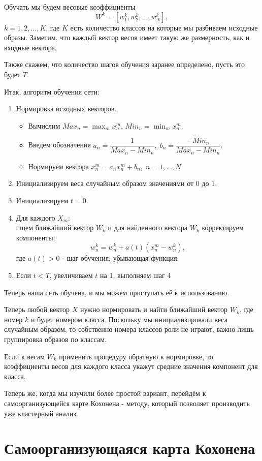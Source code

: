 \documentclass[a4paper,12pt]{article}
\begin{document}
Обучать мы будем весовые коэффициенты
\[
  W^k = [w_1^k, w_2^k, ..., w_N^k],
\]
$k = 1, 2, ..., K$, где $K$ есть количество классов на которые мы разбиваем исходные образы. Заметим, что каждый вектор весов имеет такую же размерность, как и входные вектора.

Также скажем, что количество шагов обучения заранее определено, пусть это будет $T$.

Итак, алгоритм обучения сети:
\begin{enumerate}
  \item Нормировка исходных векторов.
  \begin{itemize}
    \item Вычислим $Max_n=\max_m x^m_n$, $Min_n=\min_m x^m_n$.
    \item Введем обозначения \(a_n = \dfrac1{Max_n-Min_n}, \; b_n=\dfrac{-Min_n}{Max_n-Min_n}\).
    \item Нормируем вектора $x^m_n=a_n x^m_n+b_n, \; n=1,...,N$.
  \end{itemize}
  \item Инициализируем веса случайным образом значениями от $0$ до $1$.
  \item Инициализируем $t = 0$.
  \item Для каждого $X_m$: \\
  ищем ближайший вектор $W_k$ и для найденного вектора $W_k$ корректируем компоненты:
  \[
    w^k_n=w^k_n+a(t)(x^m_n-w^k_n),  
  \]
  где $a(t) > 0$ - шаг обучения, убывающая функция.
  \item Если $t < T$, увеличиваем $t$ на 1, выполняем шаг 4
\end{enumerate}

Теперь наша сеть обучена, и мы можем приступать её к использованию.

Теперь любой вектор $X$ нужно нормировать и найти ближайший вектор $W_k$, где номер $k$ и будет номером класса. Поскольку мы инициализировали веса случайным образом, то собственно номера классов роли не играют, важно лишь группировка образов по классам.

Если к весам $W_k$ применить процедуру обратную к нормировке, то коэффициенты весов для каждого класса укажут средние значения компонент для класса.\cite{kohonen_network_learning}

Теперь же, когда мы изучили более простой вариант, перейдём к самоорганизующейся карте Кохонена - методу, который позволяет производить уже кластерный анализ.

\section{Самоорганизующаяся карта Кохонена}
\end{document}
